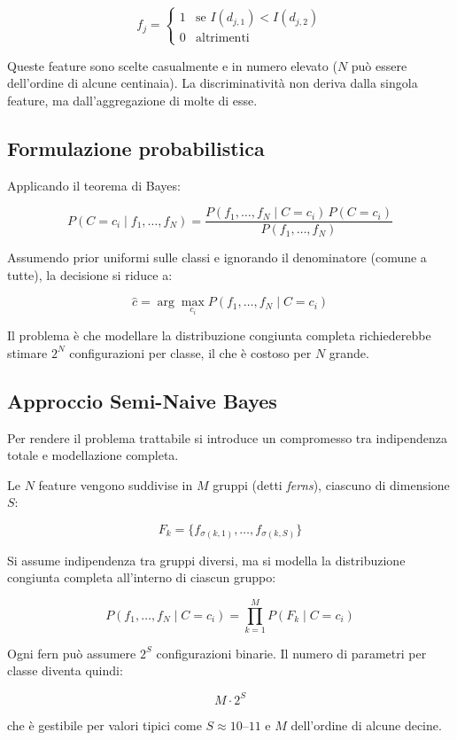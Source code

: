 \[
f_j =
\begin{cases}
1 & \text{se } I(d_{j,1}) < I(d_{j,2}) \\
0 & \text{altrimenti}
\end{cases}
\]

Queste feature sono scelte casualmente e in numero elevato ($N$ può essere dell’ordine di alcune centinaia). 
La discriminatività non deriva dalla singola feature, ma dall’aggregazione di molte di esse.

\subsection{Formulazione probabilistica}

Applicando il teorema di Bayes:

\[
P(C = c_i \mid f_1, \dots, f_N)
=
\frac{
P(f_1, \dots, f_N \mid C = c_i)\, P(C = c_i)
}{
P(f_1, \dots, f_N)
}
\]

Assumendo prior uniformi sulle classi e ignorando il denominatore (comune a tutte), la decisione si riduce a:

\[
\hat{c} = \arg\max_{c_i} P(f_1, \dots, f_N \mid C = c_i)
\]

Il problema è che modellare la distribuzione congiunta completa richiederebbe stimare $2^N$ configurazioni per classe, il che è costoso per $N$ grande.

\subsection{Approccio Semi-Naive Bayes}

Per rendere il problema trattabile si introduce un compromesso tra indipendenza totale e modellazione completa.

Le $N$ feature vengono suddivise in $M$ gruppi (detti \emph{ferns}), ciascuno di dimensione $S$:

\[
F_k = \{ f_{\sigma(k,1)}, \dots, f_{\sigma(k,S)} \}
\]

Si assume indipendenza tra gruppi diversi, ma si modella la distribuzione congiunta completa all’interno di ciascun gruppo:

\[
P(f_1, \dots, f_N \mid C=c_i)
=
\prod_{k=1}^{M}
P(F_k \mid C=c_i)
\]

Ogni fern può assumere $2^S$ configurazioni binarie. 
Il numero di parametri per classe diventa quindi:

\[
M \cdot 2^S
\]

che è gestibile per valori tipici come $S \approx 10$–$11$ e $M$ dell’ordine di alcune decine.

